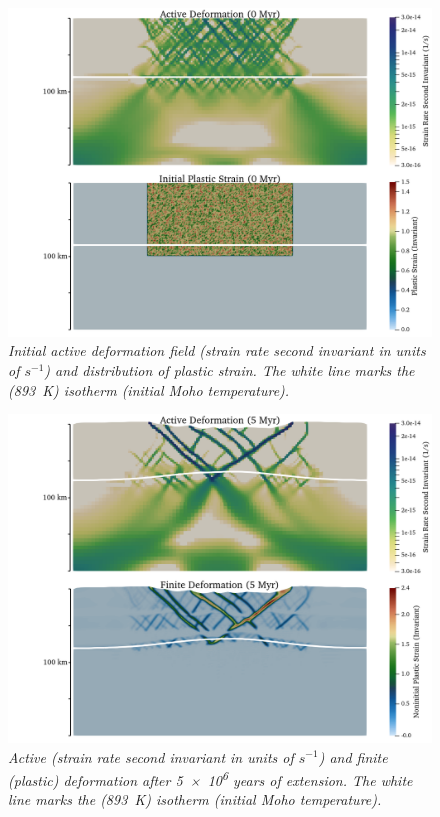 \begin{figure}
\centering
\includegraphics[width=\textwidth]{cookbooks/continental_extension/doc/continental_extension_cookbook_0myr.png}
\caption{\it Initial active deformation field (strain rate second invariant in units of $s^{-1}$) and distribution of plastic strain. The white line marks the (\SI{893}{K}) isotherm (initial Moho temperature).}
\label{fig:continental_extension_cookbook_0myr}
\end{figure}
\begin{figure}
\includegraphics[width=\textwidth]{cookbooks/continental_extension/doc/continental_extension_cookbook_5myr.png}
\caption{\it Active (strain rate second invariant in units of $s^{-1}$) and finite (plastic) deformation after \num{5e6} years of extension. The white line marks the (\SI{893}{K}) isotherm (initial Moho temperature).}
\label{fig:continental_extension_cookbook_5myr}
\end{figure}
